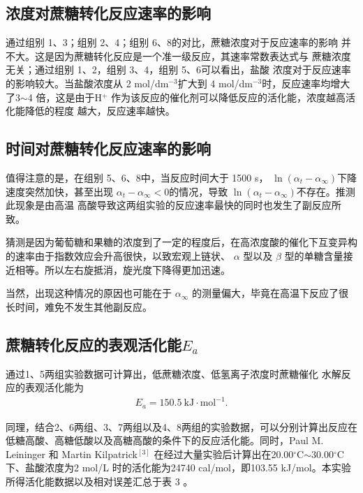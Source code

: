 \documentclass[12pt]{ctexart}
\numberwithin{equation}{section}
\begin{document}
\subsection{浓度对蔗糖转化反应速率的影响}

通过组别 1、3；组别 2、4；组别 6、8的对比，蔗糖浓度对于反应速率的影响
并不大。这是因为蔗糖转化反应是一个准一级反应，其速率常数表达式与
蔗糖浓度无关；通过组别 1、2，组别 3、4，组别 5、6可以看出，盐酸
浓度对于反应速率的影响较大。当盐酸浓度从 2 mol/dm$^{-3}$扩大到
4 mol/dm$^{-3}$时，反应速率均增大了3$\sim$4 倍，这是由于H$^+$
作为该反应的催化剂可以降低反应的活化能，浓度越高活化能降低的程度
越大，反应速率越快。

\subsection{时间对蔗糖转化反应速率的影响}

值得注意的是，在组别 5、6、8中，当反应时间大于 1500 s，
$\ln(\alpha_t-\alpha_{\infty})$下降速度突然加快，甚至出现
$\alpha_t - \alpha_\infty < 0$的情况，导致
$\ln(\alpha_t - \alpha_\infty)$不存在。推测此现象是由高温
高酸导致这两组实验的反应速率最快的同时也发生了副反应所致。

猜测是因为葡萄糖和果糖的浓度到了一定的程度后，在高浓度酸的催化下互变异构的速率由于指数效应会升高很快，以致宏观上链状、 $\alpha$ 型以及 $\beta$ 型的单糖含量接近相等。所以左右旋抵消，旋光度下降得更加迅速。

当然，出现这种情况的原因也可能在于 $\alpha_{\infty}$ 的测量偏大，毕竟在高温下反应了很长时间，难免不发生其他副反应。

\subsection{\texorpdfstring{蔗糖转化反应的表观活化能$E_a$}{蔗糖转化反应的表观活化能}}

通过1、5两组实验数据可计算出，低蔗糖浓度、低氢离子浓度时蔗糖催化
水解反应的表观活化能为
\begin{align}
    E_a = 150.5~\mathrm{kJ\cdot mol^{-1}}.
\end{align}

同理，结合2、6两组、3、7两组以及4、8两组的实验数据，可以分别计算出反应在低糖高酸、高糖低酸以及高糖高酸的条件下的反应活化能。同时，Paul M. Leininger 和 Martin Kilpatrick$^{[3]}$ 在经过大量实验后计算出在20.00$^\circ$C$\sim$30.00$^\circ$C下、盐酸浓度为2 mol/L
时的活化能为24740 cal/mol，即103.55 kJ/mol。本实验所得活化能数据以及相对误差汇总于表 3 。
\end{document}
